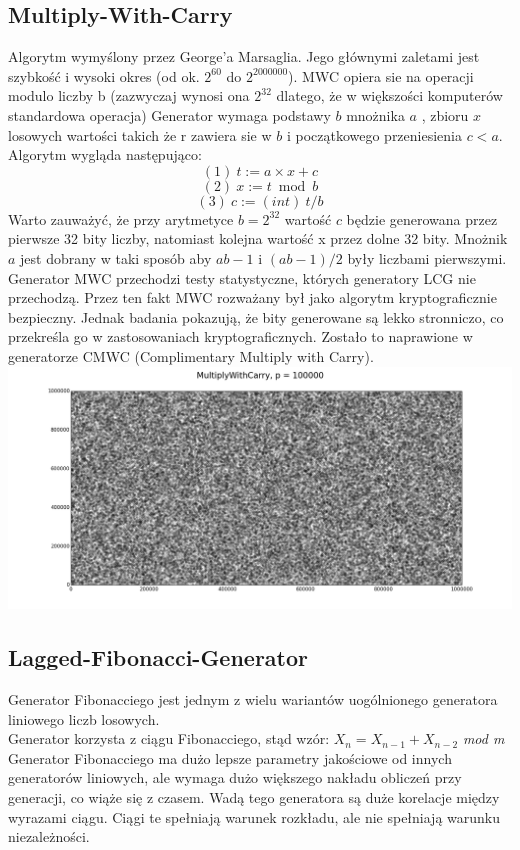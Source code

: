 \documentclass[a4paper, 11pt]{article} %
\begin{document}
\subsection{Multiply-With-Carry}
Algorytm wymyślony przez George'a Marsaglia. Jego głównymi zaletami jest szybkość i wysoki okres (od ok. $2^{60} $ do $2^{2000000}$).
MWC opiera sie na operacji modulo liczby b (zazwyczaj wynosi ona $2^{32}$ dlatego, że w większości komputerów standardowa operacja) 
Generator wymaga podstawy $b$ mnożnika $a$ , zbioru $x$ losowych wartości takich że r zawiera sie w $b$ i początkowego przeniesienia $c < a$. 
Algorytm wygląda następująco:
$$(1)\ t:=a \times x + c $$
$$(2)\ x:= t \bmod  b $$
$$(3)\ c:= (int)\ t/b$$
Warto zauważyć, że przy arytmetyce $b=2^{32}$ wartość $c$ będzie generowana przez pierwsze 32 bity liczby, natomiast kolejna wartość x przez dolne 32 bity. Mnożnik $a$ jest dobrany w taki sposób aby $ab-1$ i $(ab-1)/2$ były liczbami pierwszymi.
\newline Generator MWC przechodzi testy statystyczne, których generatory LCG nie przechodzą. Przez ten fakt MWC rozważany był jako algorytm kryptograficznie bezpieczny. Jednak badania pokazują, że bity generowane są lekko stronniczo, co przekreśla go w zastosowaniach kryptograficznych. Zostało to naprawione w generatorze CMWC (Complimentary Multiply with Carry).\\
\includegraphics[width=\linewidth]{img/mwc-1.png}

	

    \subsection{Lagged-Fibonacci-Generator}
    Generator Fibonacciego jest jednym z wielu wariantów uogólnionego generatora liniowego liczb losowych. \\
    Generator korzysta z ciągu Fibonacciego, stąd wzór:
    $X_{n}=X_{n-1}+X_{n-2}$ \textit{mod m}
    Generator Fibonacciego ma dużo lepsze parametry jakościowe od innych generatorów liniowych, ale wymaga dużo większego nakładu obliczeń przy generacji, co wiąże się z czasem. Wadą tego generatora są duże korelacje między wyrazami ciągu. Ciągi te spełniają warunek rozkładu, ale nie spełniają warunku niezależności.
\end{document}
